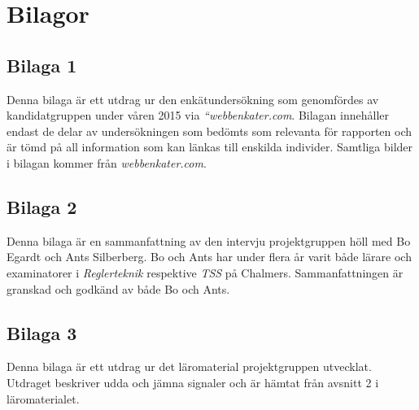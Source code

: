 \documentclass[]{article}
\begin{document}
\newpage




\newpage

\section{Bilagor}
\subsection{Bilaga 1}
Denna bilaga är ett utdrag ur den enkätundersökning som genomfördes av kandidatgruppen under våren 2015
via \textit{“webbenkater.com}. Bilagan innehåller endast de delar av undersökningen som bedömts som relevanta
för rapporten och är tömd på all information som kan länkas till enskilda individer. Samtliga bilder i bilagan
kommer från \textit{webbenkater.com}.
\newpage

\subsection{Bilaga 2}
\label{bil:exam_intervju}
Denna bilaga är en sammanfattning av den intervju projektgruppen höll med Bo Egardt och Ants Silberberg. Bo och Ants
har under flera år varit både lärare och examinatorer i \textit{Reglerteknik} respektive \textit{TSS} på Chalmers.
Sammanfattningen är granskad och godkänd av både Bo och Ants.
\newpage

\subsection{Bilaga 3}
Denna bilaga är ett utdrag ur det läromaterial projektgruppen utvecklat. Utdraget beskriver udda och jämna signaler och
är hämtat från avsnitt 2 i läromaterialet.
\end{document}
